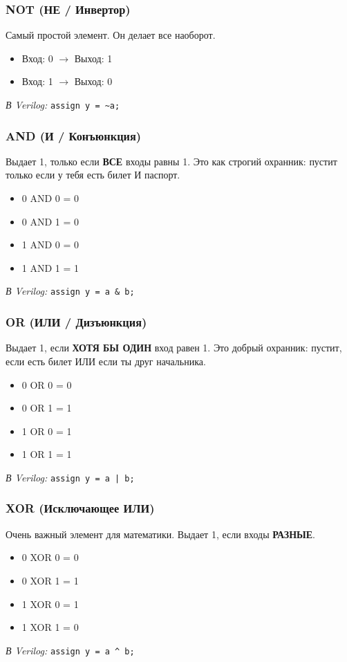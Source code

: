 \documentclass[12pt, a4paper]{article}
\begin{document}
\subsubsection{NOT (НЕ / Инвертор)}
Самый простой элемент. Он делает все наоборот.
\begin{itemize}
    \item Вход: 0 $\rightarrow$ Выход: 1
    \item Вход: 1 $\rightarrow$ Выход: 0
\end{itemize}
\textit{В Verilog:} \texttt{assign y = \~{}a;}

\subsubsection{AND (И / Конъюнкция)}
Выдает 1, только если \textbf{ВСЕ} входы равны 1. Это как строгий охранник: пустит только если у тебя есть билет И паспорт.
\begin{itemize}
    \item 0 AND 0 = 0
    \item 0 AND 1 = 0
    \item 1 AND 0 = 0
    \item 1 AND 1 = 1
\end{itemize}
\textit{В Verilog:} \texttt{assign y = a \& b;}

\subsubsection{OR (ИЛИ / Дизъюнкция)}
Выдает 1, если \textbf{ХОТЯ БЫ ОДИН} вход равен 1. Это добрый охранник: пустит, если есть билет ИЛИ если ты друг начальника.
\begin{itemize}
    \item 0 OR 0 = 0
    \item 0 OR 1 = 1
    \item 1 OR 0 = 1
    \item 1 OR 1 = 1
\end{itemize}
\textit{В Verilog:} \texttt{assign y = a | b;}

\subsubsection{XOR (Исключающее ИЛИ)}
Очень важный элемент для математики. Выдает 1, если входы \textbf{РАЗНЫЕ}.
\begin{itemize}
    \item 0 XOR 0 = 0
    \item 0 XOR 1 = 1
    \item 1 XOR 0 = 1
    \item 1 XOR 1 = 0
\end{itemize}
\textit{В Verilog:} \texttt{assign y = a \^{} b;}
\end{document}
